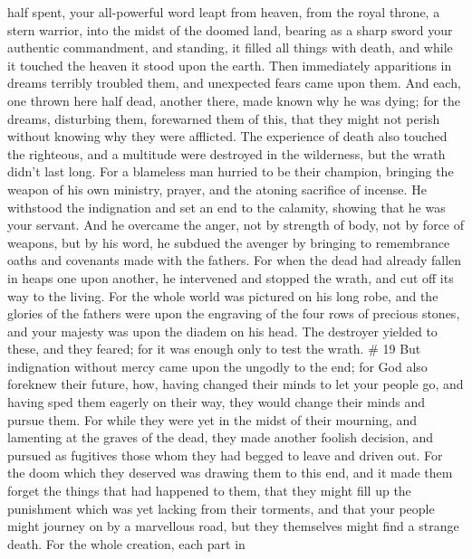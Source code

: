 half spent,  your all-powerful word leapt from heaven, from
the royal throne, a stern warrior, into the midst of the doomed land,
 bearing as a sharp sword your authentic commandment, and
standing, it filled all things with death, and while it touched the
heaven it stood upon the earth.  Then immediately
apparitions in dreams terribly troubled them, and unexpected fears came
upon them.  And each, one thrown here half dead, another
there, made known why he was dying;  for the dreams,
disturbing them, forewarned them of this, that they might not perish
without knowing why they were afflicted.  The experience of
death also touched the righteous, and a multitude were destroyed in the
wilderness, but the wrath didn't last long.  For a
blameless man hurried to be their champion, bringing the weapon of his
own ministry, prayer, and the atoning sacrifice of incense. He withstood
the indignation and set an end to the calamity, showing that he was your
servant.  And he overcame the anger, not by strength of
body, not by force of weapons, but by his word, he subdued the avenger
by bringing to remembrance oaths and covenants made with the fathers.
 For when the dead had already fallen in heaps one upon
another, he intervened and stopped the wrath, and cut off its way to the
living.  For the whole world was pictured on his long robe,
and the glories of the fathers were upon the engraving of the four rows
of precious stones, and your majesty was upon the diadem on his head.
 The destroyer yielded to these, and they feared; for it
was enough only to test the wrath. \# 19  But indignation
without mercy came upon the ungodly to the end; for God also foreknew
their future,  how, having changed their minds to let your
people go, and having sped them eagerly on their way, they would change
their minds and pursue them.  For while they were yet in the
midst of their mourning, and lamenting at the graves of the dead, they
made another foolish decision, and pursued as fugitives those whom they
had begged to leave and driven out.  For the doom which they
deserved was drawing them to this end, and it made them forget the
things that had happened to them, that they might fill up the punishment
which was yet lacking from their torments,  and that your
people might journey on by a marvellous road, but they themselves might
find a strange death.  For the whole creation, each part in
